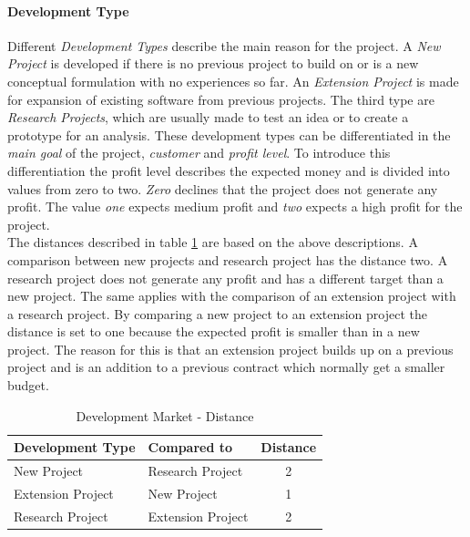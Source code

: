 \paragraph*{\textbf{Development Type}}
Different \textit{Development Types} describe the main reason for the project. A \textit{New Project} is developed if there is no previous project to build on or is a new conceptual formulation with no experiences so far. An \textit{Extension Project} is made for expansion of existing software from previous projects. The third type are \textit{Research Projects}, which are usually made to test an idea or to create a prototype for an analysis. These development types can be differentiated in the \textit{main goal} of the project, \textit{customer} and \textit{profit level}. To introduce this differentiation the profit level describes the expected money and is divided into values from zero to two. \textit{Zero} declines that the project does not generate any profit. The value \textit{one} expects medium profit and \textit{two} expects a high profit for the project.\\
The distances described in table \ref{property:devtype} are based on the above descriptions. A comparison between new projects and research project has the distance two. A research project does not generate any profit and has a different target than a new project. The same applies with the comparison of an extension project with a research project. By comparing a new project to an extension project the distance is set to one because the expected profit is smaller than in a new project. The reason for this is that an extension project builds up on a previous project and is an addition to a previous contract which normally get a smaller budget.\\
\begin{table}[h]
	\centering 
	\setlength{\tabcolsep}{4pt}
	\begin{tabular}{|l|l|c|}\hline
		Development Type		& Compared to 			&  Distance 	\\ \hline
		New Project   			& Research Project		& 2      		\\ \hline
		Extension Project   	& New Project 			& 1      		\\ \hline
		Research Project   		& Extension Project 	& 2     		\\ \hline
	\end{tabular} 
	\caption{Development Market - Distance} 
	\label{property:devtype} 
\end{table}
